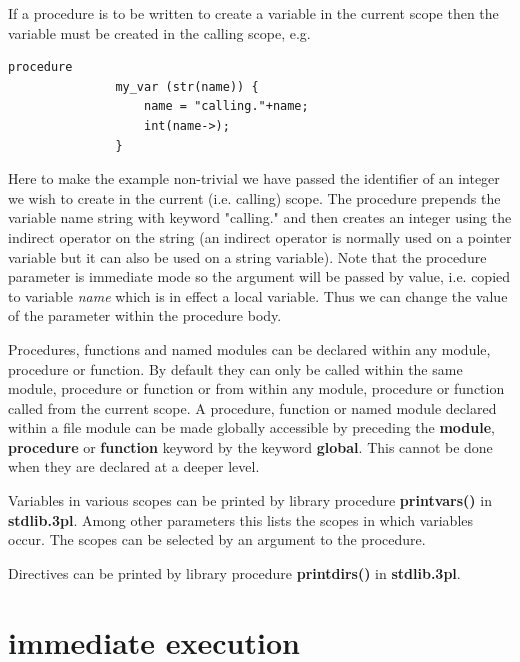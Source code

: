        If a procedure is to be written to create a variable in the current scope
        then the variable must be created in the calling scope, e.g.
        \begin{lstlisting}[gobble=8, language=threepl]
               procedure
               my_var (str(name)) {
                   name = "calling."+name;
                   int(name->);
               }
        \end{lstlisting}
        Here to make the example non-trivial we have passed the identifier of an
        integer we wish to create in the current (i.e. calling) scope. The
        procedure prepends the variable name string with keyword "calling." and
        then creates an integer using the indirect operator on the string (an
        indirect operator is normally used on a pointer variable but it can also
        be used on a string variable). Note that the procedure parameter is
        immediate mode so the argument will be passed by value, i.e. copied to
        variable {\em name} which is in effect a local variable. Thus we can
        change the value of the parameter within the procedure body.

        Procedures, functions and named modules can be declared within any
        module, procedure or function. By default they can only be called within
        the same module, procedure or function or from within any module,
        procedure or function called from the current scope. A procedure,
        function or named module declared within a file module can be made
        globally accessible by preceding the {\bf module}, {\bf procedure} or
        {\bf function} keyword by the keyword {\bf global}. This cannot be done
        when they are declared at a deeper level.

        Variables in various scopes can be printed by library procedure {\bf
        printvars()}  in {\bf stdlib.3pl}. Among other
        parameters this lists the scopes in which variables occur. The scopes can
        be selected by an argument to the procedure.

        Directives can be printed by library procedure {\bf printdirs()}
         in {\bf stdlib.3pl}.


        
    \section{immediate execution}
    
